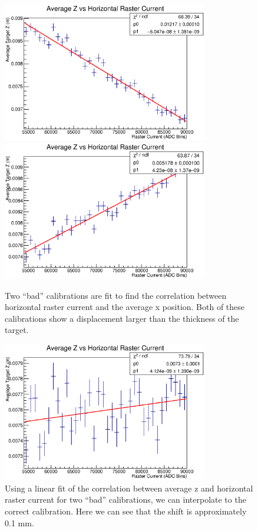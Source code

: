 \begin{figure}
\begin{center}
	\includegraphics[width=0.8\textwidth]{./app1/figures/old1_avgzvx.eps}
	\includegraphics[width=0.8\textwidth]{./app1/figures/old2_avgzvx.eps}
	\caption{Two ``bad'' calibrations are fit to find the correlation between horizontal raster current and the average x position. Both of these calibrations show a displacement larger than the thickness of the target.}
	\label{fig:badcal}
\end{center}
\end{figure}
\begin{figure}
\begin{center}
	\includegraphics[width=0.8\textwidth]{./app1/figures/avgzvx.eps}
	\caption{Using a linear fit of the correlation between average z and horizontal raster current for two ``bad'' calibrations, we can interpolate to the correct calibration. Here we can see that the shift is approximately 0.1 mm.}
	\label{fig:zfit}
\end{center}
\end{figure}

